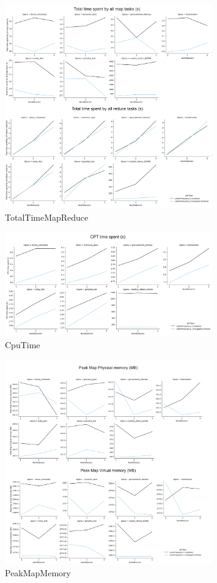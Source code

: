 \documentclass[a4paper, 12pt]{article}
\begin{document}
\begin{figure}[ht!]
  \centering
  \includegraphics[width=0.8\textwidth]{media/performance/TotalTimeMapReduce.png}
  \caption{TotalTimeMapReduce}
  \label{fig:TotalTimeMapReduce}
\end{figure}

\begin{figure}[ht!]
  \centering
  \includegraphics[width=0.8\textwidth]{media/performance/CpuTIME.png}
  \caption{CpuTime}
  \label{fig:CpuTIME}
\end{figure}

\begin{figure}[ht!]
  \centering
  \includegraphics[width=0.8\textwidth]{media/performance/PeakMapMemory.png}
  \caption{PeakMapMemory}
  \label{fig:PeakMapMemory}
\end{figure}
\end{document}
